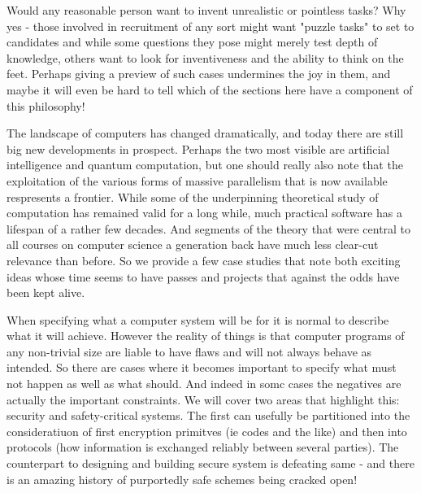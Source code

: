 \begin{longdescription}
\item[Challenges that make good puzzles]

Would any reasonable person want to invent unrealistic or pointless tasks? 
Why yes - those involved in recruitment of any sort might want "puzzle 
tasks" to set to candidates and while some questions they pose might 
merely test depth of knowledge, others want to look for inventiveness and 
the ability to think on the feet. Perhaps giving a preview of such
cases undermines the joy in them, and maybe it will even be hard to tell
which of the sections here have a component of this philosophy!

\item[Future-proofing]

The landscape of computers has changed dramatically, and today there are 
still big new developments in prospect. Perhaps the two most visible are
artificial intelligence and quantum computation, but one should really 
also note that the exploitation of the various forms of massive 
parallelism that is now available respresents a frontier. While some of 
the underpinning theoretical study of computation has remained valid for a 
long while, much practical software has a lifespan of a rather few 
decades. And segments of the theory that were central to all courses on 
computer science a generation back have much less clear-cut relevance than 
before. So we provide a few case studies that note both exciting ideas 
whose time seems to have passes and projects that against the odds have 
been kept alive.

\item[Emphasize what must not happen as much as what will]

When specifying what a computer system will be for it is normal to 
describe what it will achieve. However the reality of things is that
computer programs of any non-trivial size are liable to have flaws and 
will not always behave as intended. So there are cases where it becomes
important to specify what must not happen as well as what should. And 
indeed in somc cases the negatives are actually the important constraints.
We will cover two areas that highlight this: security and safety-critical 
systems. The first can usefully be partitioned into the consideratiuon of 
first encryption primitves (ie codes and the like) and then into protocols 
(how information is exchanged reliably between several parties). The 
counterpart to designing and building secure system is defeating same - 
and there is an amazing history of purportedly safe schemes being cracked 
open!


\end{longdescription}

